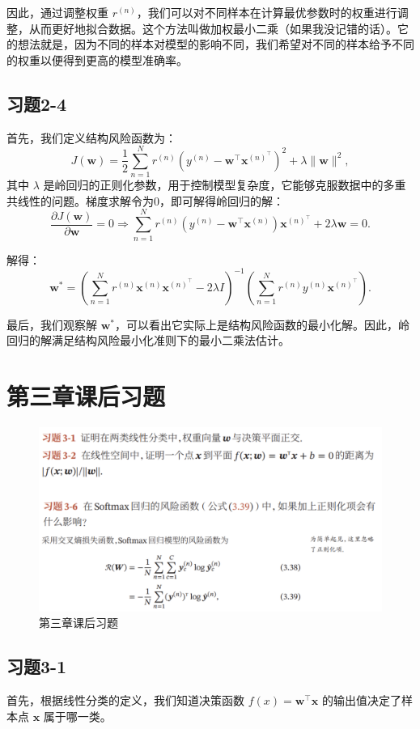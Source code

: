 \documentclass[]{article}
\begin{document}
因此，通过调整权重 $r^{(n)}$，我们可以对不同样本在计算最优参数时的权重进行调整，从而更好地拟合数据。这个方法叫做加权最小二乘（如果我没记错的话）。它的想法就是，因为不同的样本对模型的影响不同，我们希望对不同的样本给予不同的权重以便得到更高的模型准确率。


\subsection{习题2-4}

首先，我们定义结构风险函数为：
$$
J(\mathbf{w}) = \frac{1}{2} \sum_{n=1}^N r^{(n)} \left( y^{(n)} - \mathbf{w}^{\top} \mathbf{x}^{(n)^{\top}} \right)^2 + \lambda \|\mathbf{w}\|^2,
$$
其中 $\lambda$ 是岭回归的正则化参数，用于控制模型复杂度，它能够克服数据中的多重共线性的问题。梯度求解令为0，即可解得岭回归的解：
$$
\frac{\partial J(\mathbf{w})}{\partial \mathbf{w}} = 0 \Rightarrow \sum_{n=1}^N r^{(n)} \left( y^{(n)} - \mathbf{w}^{\top} \mathbf{x}^{(n)} \right) \mathbf{x}^{(n)^{\top}} + 2\lambda \mathbf{w} = 0.
$$

解得：
$$
\mathbf{w}^* = \left( \sum_{n=1}^N r^{(n)} \mathbf{x}^{(n)} \mathbf{x}^{(n)^{\top}} - 2\lambda I \right)^{-1} \left( \sum_{n=1}^N r^{(n)} y^{(n)} \mathbf{x}^{(n)^{\top}} \right).
$$

最后，我们观察解 $\mathbf{w}^*$，可以看出它实际上是结构风险函数的最小化解。因此，岭回归的解满足结构风险最小化准则下的最小二乘法估计。


\section{第三章课后习题}
\begin{figure}[H]
	\centering
	\includegraphics[width=1\linewidth]{第三章课后习题}
	\caption{第三章课后习题}
	\label{fig:}
\end{figure}
\subsection{习题3-1}
首先，根据线性分类的定义，我们知道决策函数 $f(x) = \mathbf{w}^{\top} \mathbf{x}$ 的输出值决定了样本点 $\mathbf{x}$ 属于哪一类。
\end{document}
